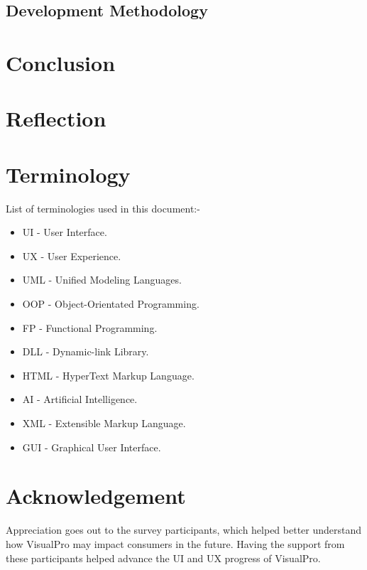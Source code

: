 \documentclass[conference]{IEEEtran}
\begin{document}
      \subsection{Development Methodology}

    \section{Conclusion}

    \section{Reflection}

    \section{Terminology}
      List of terminologies used in this document:-
      \begin{itemize}
        \item UI - User Interface.
        \item UX - User Experience.
        \item UML - Unified Modeling Languages.
        \item OOP - Object-Orientated Programming.
        \item FP - Functional Programming.
        \item DLL - Dynamic-link Library.
        \item HTML - HyperText Markup Language.
        \item AI - Artificial Intelligence.
        \item XML - Extensible Markup Language.
        \item GUI - Graphical User Interface.
      \end{itemize}

    \section*{Acknowledgement}
    Appreciation goes out to the survey participants, which helped better understand how VisualPro may impact consumers in the future. Having the support from these participants helped advance the UI and UX progress of VisualPro.

	\renewcommand\refname{\section{Reference List}}
	\small{
    }
\end{document}
